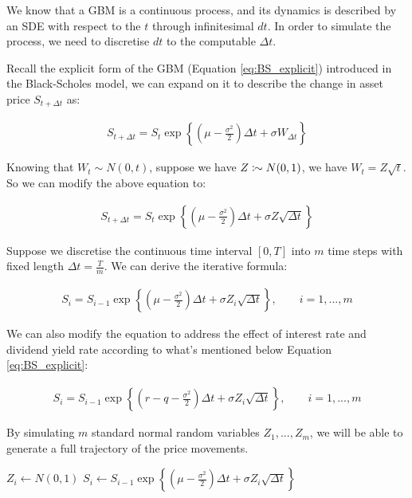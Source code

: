 We know that a GBM is a continuous process, and its dynamics is described by an SDE with respect to the $t$ through infinitesimal $dt$. In order to simulate the process, we need to discretise $dt$ to the computable $\Delta t$.

Recall the explicit form of the GBM (Equation \ref{eq:BS_explicit}) introduced in the Black-Scholes model, we can expand on it to describe the change in asset price $S_{t+\Delta t}$ as:

\begin{align*}
S_{t+\Delta t} = S_t\exp{\left\{(\mu-\frac{\sigma^2}{2})\Delta t+\sigma W_{\Delta t}\right\}}
\end{align*}

Knowing that $W_t\sim N(0,t)$, suppose we have $Z\colonsim N(0,1)$, we have $W_t=Z\sqrt{t}$. So we can modify the above equation to:

\begin{align*}
S_{t+\Delta t} = S_t\exp{\left\{(\mu-\frac{\sigma^2}{2})\Delta t+\sigma Z \sqrt{\Delta t}\right\}}
\end{align*}

Suppose we discretise the continuous time interval $[0,T]$ into $m$ time steps with fixed length $\Delta t=\frac{T}{m}$. We can derive the iterative formula:

\begin{align} \label{eq:mc_explicit}
S_{i} = S_{i-1}\exp{\left\{(\mu-\frac{\sigma^2}{2})\Delta t+\sigma Z_i \sqrt{\Delta t}\right\}},\qquad i=1,...,m
\end{align}

We can also modify the equation to address the effect of interest rate and dividend yield rate according to what's mentioned below Equation \ref{eq:BS_explicit}:

\begin{align} \label{eq:mc_explicit_rq}
S_{i} = S_{i-1}\exp{\left\{(r-q-\frac{\sigma^2}{2})\Delta t+\sigma Z_i \sqrt{\Delta t}\right\}},\qquad i=1,...,m
\end{align}

By simulating $m$ standard normal random variables $Z_1,...,Z_m$, we will be able to generate a full trajectory of the price movements.

\begin{algorithmic}
	\State $Z_{i} \gets N(0,1)$
	\State $S_{i} \gets S_{i-1}\exp{\left\{(\mu-\frac{\sigma^2}{2})\Delta t+\sigma Z_i \sqrt{\Delta t}\right\}}$
\EndFor
\end{algorithmic}

